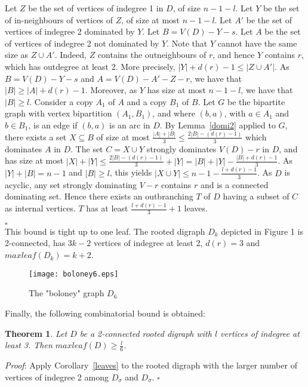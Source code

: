 \documentclass{article}
\newtheorem{theorem}{Theorem}
\begin{document}
Let $Z$ be the set of vertices of indegree 1 in $D$, of size $n-1-l$. Let $Y$ be the set of in-neighbours of vertices of $Z$, of size at most $n-1-l$. Let $A'$ be the set of vertices of indegree 2 dominated by $Y$. Let $B=V(D)-Y-s$. Let $A$ be the set of vertices of indegree 2 not dominated by $Y$. Note that $Y$ cannot have the same size as $Z\cup A'$. Indeed, $Z$ contains the outneighbours of $r$, and hence $Y$ contains $r$, which has outdegree at least 2. More precisely, $|Y|+d(r)-1\le|Z\cup A'|$. As $B=V(D)-Y-s$ and $A=V(D)-A'-Z-r$, we have that $|B|\ge|A|+d(r)-1$. Moreover, as $Y$ has size at most $n-1-l$, we have that $|B|\ge l$. Consider a copy $A_1$ of $A$ and a copy $B_1$ of $B$. Let $G$ be the bipartite graph with vertex bipartition $(A_1,B_1)$, and where $(b,a)$, with $a\in A_1$ and $b\in B_1$, is an edge if $(b,a)$ is an arc in $D$. By Lemma~\ref{domi2} applied to $G$, there exists a set $X\subseteq B$ of size at most $\frac{|A|+|B|}{3}\le\frac{2|B|-(d(r)-1)}{3}$ which dominates $A$ in $D$. The set $C=X\cup Y$ strongly dominates $V(D)-r$ in $D$, and has size at most $|X|+|Y|\le \frac{2|B|-(d(r)-1)}{3}+|Y|= |B|+|Y|-\frac{|B|+d(r)-1}{3}$. As $|Y|+|B|=n-1$ and $|B|\ge l$, this yields $|X\cup Y| \le n-1-\frac{l+d(r)-1}{3}$. As $D$ is acyclic, any set strongly dominating $V-r$ contains $r$ and is a connected dominating set. Hence there exists an outbranching $T$ of $D$ having a subset of $C$ as internal vertices. $T$ has at least $\frac{l+d(r)-1}{3}+1$ leaves. 


$\square$\\

This bound is tight up to one leaf. The rooted digraph $D_k$ depicted in Figure 1 is 2-connected, has $3k-2$ vertices of indegree at least 2, $d(r)=3$ and $maxleaf(D_k)=k+2$.


\vspace{12pt}

\begin{figure}
\centering
\texttt{[image: boloney6.eps]}
\caption{The "boloney" graph $D_6$}
\end{figure}

Finally, the following combinatorial bound is obtained:

\begin{theorem}\label{bound1}
Let $D$ be a 2-connected rooted digraph with $l$ vertices of indegree at least 3. Then  $maxleaf(D)\ge\frac{l}{6}$.
\end{theorem}
\emph{Proof}: Apply Corollary~\ref{leaves} to the rooted digraph with the larger number of vertices of indegree 2 among $D_{\sigma}$ and $D_{\bar{\sigma}}$. $\square$\\
\end{document}
